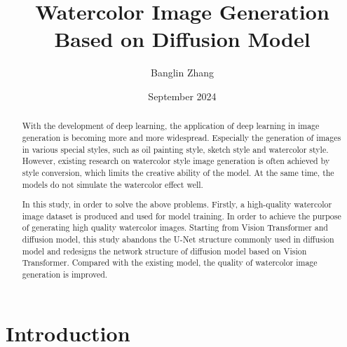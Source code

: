 \documentclass[12pt]{report}
\title{Watercolor Image Generation Based on Diffusion Model}
\author{Banglin Zhang}{M225163  }
\date{ September 2024}{August 2024}
\begin{document}
\maketitle



\begin{abstract}
With the development of deep learning, the application of deep learning in image generation is becoming more and more widespread. Especially the generation of images in various special styles, such as oil painting style, sketch style and watercolor style. However, existing research on watercolor style image generation is often achieved by style conversion, which limits the creative ability of the model. At the same time, the models do not simulate the watercolor effect well.

In this study, in order to solve the above problems. Firstly, a high-quality watercolor image dataset is produced and used for model training. In order to achieve the purpose of generating high quality watercolor images. Starting from Vision Transformer and diffusion model, this study abandons the U-Net structure commonly used in diffusion model and redesigns the network structure of diffusion model based on Vision Transformer. Compared with the existing model, the quality of watercolor image generation is improved.
\end{abstract}
\newpage

\tableofcontents
\listoffigures
\newpage
{}




\chapter{Introduction}
\end{document}
